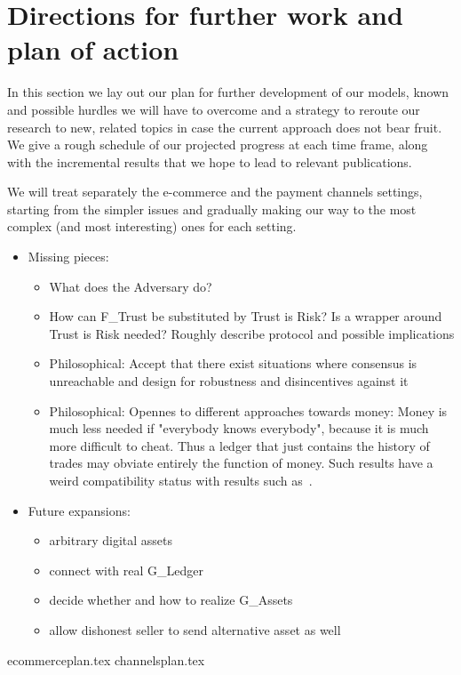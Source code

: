 \section{Directions for further work and plan of action}
\label{sec:plan}
  In this section we lay out our plan for further development of our models, known and
  possible hurdles we will have to overcome and a strategy to reroute our research to new,
  related topics in case the current approach does not bear fruit. We give a rough
  schedule of our projected progress at each time frame, along with the incremental
  results that we hope to lead to relevant publications.

  We will treat separately the e-commerce and the payment channels settings, starting from
  the simpler issues and gradually making our way to the most complex (and most
  interesting) ones for each setting.
  \begin{itemize}
    \item Missing pieces:
    \begin{itemize}
      \item What does the Adversary do?
      \item How can F\_Trust be substituted by Trust is Risk? Is a wrapper around Trust is
      Risk needed? Roughly describe protocol and possible implications
      \item Philosophical: Accept that there exist situations where consensus is
      unreachable and design for robustness and disincentives against it
      \item Philosophical: Opennes to different approaches towards money: Money is much
      less needed if "everybody knows everybody", because it is much more difficult to
      cheat. Thus a ledger that just contains the history of trades may obviate entirely
      the function of money. Such results have a weird compatibility status with results
      such as~\cite{marketequilibrium}.
    \end{itemize}
    \item Future expansions:
    \begin{itemize}
      \item arbitrary digital assets
      \item connect with real G\_Ledger
      \item decide whether and how to realize G\_Assets
      \item allow dishonest seller to send alternative asset as well
    \end{itemize}
  \end{itemize}

  {ecommerceplan.tex}
  {channelsplan.tex}

